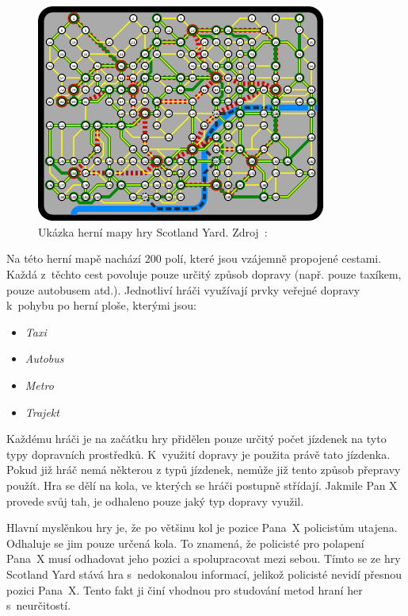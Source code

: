 \begin{figure}[H]
	\centering
	\includegraphics[width=0.85\textwidth]{obrazky-figures/scotland_original}
	\caption{Ukázka herní mapy hry Scotland Yard.
  Zdroj~\cite{scotland_original_image}:}\label{fig:figure}
\end{figure}
\newpage

Na této herní mapě nachází 200 polí, které jsou vzájemně propojené cestami.
Každá z~těchto cest povoluje pouze určitý způsob dopravy (např. pouze taxíkem, pouze autobusem atd.).
Jednotliví hráči využívají prvky veřejné dopravy k~pohybu po herní ploše, kterými jsou:

\begin{itemize}\vspace{-0.3cm}
  \item \emph{Taxi}\vspace{-0.3cm}
  \item \emph{Autobus}\vspace{-0.3cm}
  \item \emph{Metro}\vspace{-0.3cm}
  \item \emph{Trajekt}
\end{itemize}

Každému hráči je na začátku hry přidělen pouze určitý počet jízdenek na tyto typy dopravních prostředků.
K~využití dopravy je použita právě tato jízdenka.
Pokud již hráč nemá některou z typů jízdenek, nemůže již tento způsob přepravy použít.
Hra se dělí na kola, ve kterých se hráči postupně střídají.
Jakmile Pan X provede svůj tah, je odhaleno pouze jaký typ dopravy využil.

Hlavní myslěnkou hry je, že po většinu kol je pozice Pana~X policistům utajena.
Odhaluje se jim pouze určená kola.
To znamená, že policisté pro polapení Pana~X musí odhadovat jeho pozici a spolupracovat mezi sebou.
Tímto se ze hry Scotland Yard stává hra s~nedokonalou informací, jelikož policisté nevidí přesnou pozici Pana~X\@.
Tento fakt ji činí vhodnou pro studování metod hraní her s~neurčitostí.

